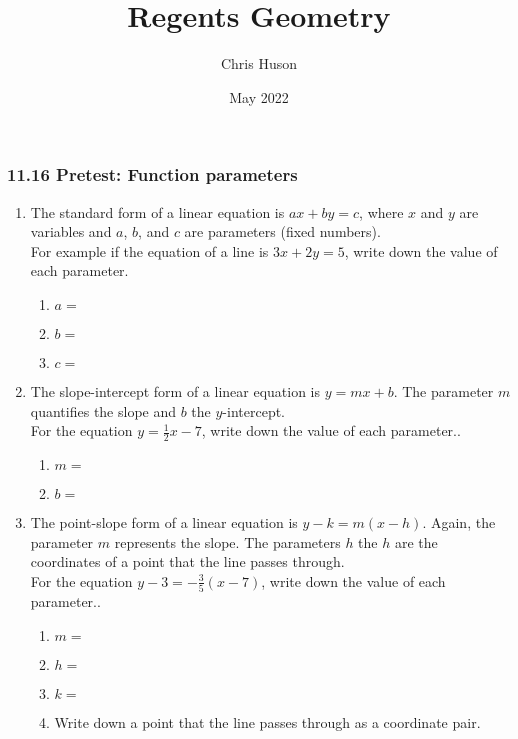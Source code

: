 \documentclass[12pt, twoside]{article}
\title{Regents Geometry}
\author{Chris Huson}
\date{May 2022}
\begin{document}
\subsubsection*{11.16 Pretest: Function parameters}
\begin{enumerate}
\item The standard form of a linear equation is $ax+by=c$, where $x$ and $y$ are variables and $a$, $b$, and $c$ are parameters (fixed numbers).\\[0.25cm]
For example if the equation of a line is $3x+2y=5$, write down the value of each parameter.
  \begin{enumerate}
    \item $a=$
    \vspace{0.5cm}
    \item $b=$
    \vspace{0.5cm}
    \item $c=$
  \end{enumerate} \vspace{0.2cm}

\item The slope-intercept form of a linear equation is $y=mx+b$. The parameter $m$ quantifies the slope and $b$ the $y$-intercept.\\[0.25cm]
For the equation $y=\frac{1}{2}x-7$, write down the value of each parameter..
  \begin{enumerate}
    \item $m=$
    \vspace{0.5cm}
    \item $b=$
    \vspace{0.2cm}
  \end{enumerate}

\item The point-slope form of a linear equation is $y-k=m(x-h)$. Again, the parameter $m$ represents the slope. The parameters $h$ the $h$ are the coordinates of a point that the line passes through.\\[0.25cm]
For the equation $y-3=-\frac{3}{5}(x-7)$, write down the value of each parameter..
  \begin{enumerate}
    \item $m=$
    \vspace{0.5cm}
    \item $h=$
    \vspace{0.5cm}
    \item $k=$
    \vspace{0.5cm}
    \item Write down a point that the line passes through as a coordinate pair.
  \end{enumerate}
  

\end{enumerate}
\end{document}
